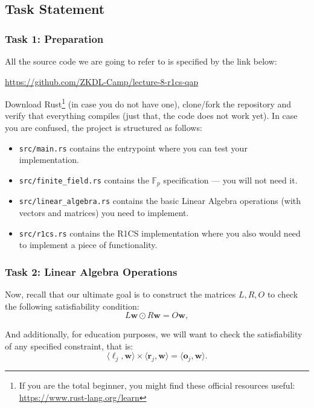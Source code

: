 \documentclass{zkdl-tests-template}
\begin{document}
\subsection{Task Statement}

\subsubsection{Task 1: Preparation}

All the source code we are going to refer to is specified by the link below:
\begin{center}
    \url{https://github.com/ZKDL-Camp/lecture-8-r1cs-qap}
\end{center}

Download Rust\footnote{If you are the total beginner, you might find these official resources useful: \url{https://www.rust-lang.org/learn}} (in case you do not have one), clone/fork the repository and verify that everything compiles (just that, the code does not work yet). In case you are confused, the project is structured as follows:
\begin{itemize}
    \item \texttt{src/main.rs} contains the entrypoint where you can test your implementation.
    \item \texttt{src/finite\_field.rs} contains the $\mathbb{F}_p$ specification --- you will not need it.
    \item \texttt{src/linear\_algebra.rs} contains the basic Linear Algebra operations (with vectors and matrices) you need to implement.
    \item \texttt{src/r1cs.rs} contains the R1CS implementation where you also would need to implement a piece of functionality.
\end{itemize}

\subsubsection{Task 2: Linear Algebra Operations}

Now, recall that our ultimate goal is to construct the matrices $L,R,O$ to check the following satisfiability condition:
\begin{equation*}
    L\mathbf{w} \odot R\mathbf{w} = O\mathbf{w},
\end{equation*}

And additionally, for education purposes, we will want to check the satisfiability of any specified constraint, that is:
\begin{equation*}
    \langle \boldsymbol{\ell}_j, \mathbf{w} \rangle \times \langle \boldsymbol{r}_j, \mathbf{w} \rangle = \langle \boldsymbol{o}_j, \mathbf{w} \rangle.
\end{equation*}
\end{document}
